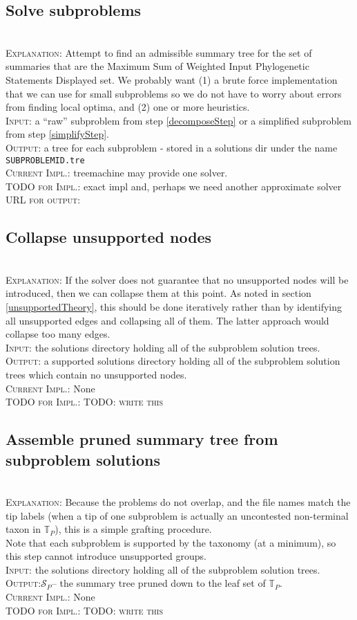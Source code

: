 \documentclass[11pt]{article}
\newcommand{\PSs}{Phylogenetic Statements\xspace}
\newcommand{\SWIPSD}{Sum of Weighted Input \PSs Displayed\xspace}
\newcommand{\MSWIPSD}{Maximum \SWIPSD \xspace}
\newcommand{\stepExplanation}[0]{\\\noindent\textsc{Explanation}:\xspace}
\newcommand{\stepInput}[0]{\\\noindent\textsc{Input}:\xspace}
\newcommand{\stepOutput}[0]{\\\noindent\textsc{Output}:\xspace}
\newcommand{\currImpl}[0]{\\\noindent\textsc{Current Impl.}:\xspace}
\newcommand{\implTODO}[0]{\\\noindent\textsc{TODO for Impl.}:\xspace}
\newcommand{\currURL}[0]{\\\noindent\textsc{URL for output}:\xspace}
\newcommand{\comment}[1]{{\color{red} \textsc{#1}}\xspace}
\newcommand{\TODO}[1]{\comment{TODO: #1}}
\newcommand{\prunedTaxonomy}[0]{\ensuremath{\mathbb{T}_P}\xspace}
\newcommand{\prunedSummary}[0]{\ensuremath{\mathcal{S}_{P}}\xspace}
\begin{document}
\subsection{Solve subproblems}
\stepExplanation Attempt to find an admissible summary tree for the set of 
    summaries that are the \MSWIPSD set.
    We probably want (1) a brute force implementation that we can use for small
    subproblems so we do not have to worry about errors from finding local 
    optima, and (2) one or more heuristics.
\stepInput a ``raw'' subproblem from step \ref{decomposeStep} or a simplified 
    subproblem from step \ref{simplifyStep}.
\stepOutput a tree for each subproblem - stored in a solutions dir under the name
    \texttt{SUBPROBLEMID.tre}
\currImpl treemachine may provide one solver.
\implTODO exact impl and, perhaps we need another approximate solver
\currURL 
 
\subsection{Collapse unsupported nodes}
\stepExplanation If the solver does not guarantee that no unsupported nodes will
    be introduced, then we can collapse them at this point.
    As noted in section \ref{unsupportedTheory}, this should be done
    iteratively rather than by identifying all unsupported edges and 
    collapsing all of them.
    The latter approach would collapse too many edges.
\stepInput the solutions directory holding all of the subproblem solution trees.
\stepOutput a supported solutions directory holding all of the subproblem solution trees
    which contain no unsupported nodes.
\currImpl None
\implTODO \TODO{write this}

\subsection{Assemble pruned summary tree from subproblem solutions}\label{assemblyStep}
\stepExplanation Because the problems do not overlap, and the file names 
    match the tip labels (when a tip of one subproblem is actually an uncontested
    non-terminal taxon in \prunedTaxonomy), this is a simple grafting procedure.\\
    Note that each subproblem is supported by the taxonomy (at a minimum), so this
    step cannot introduce unsupported groups.
\stepInput the solutions directory holding all of the subproblem solution trees.
\stepOutput \prunedSummary -- the summary tree pruned down to the leaf set of \prunedTaxonomy.
\currImpl None
\implTODO \TODO{write this}
 
\end{document}
